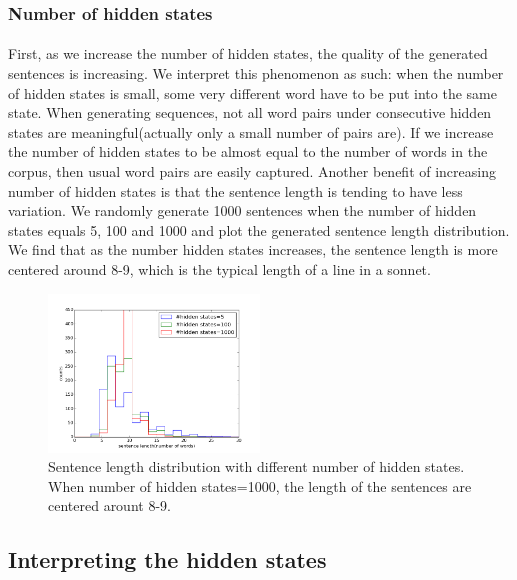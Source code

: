 %
\vspace{5pt}
\subsubsection{Number of hidden states}
\vspace{5pt}
\paragraph{}
 First, as we increase the number of hidden states, the quality of the generated sentences is increasing. We interpret this phenomenon as such: when the number of hidden states is small, some very different word have to be put into the same state. When generating sequences, not all word pairs under consecutive hidden states are meaningful(actually only a small number of pairs are). If we increase the number of hidden states to be almost equal to the number of words in the corpus, then usual word pairs are easily captured. Another benefit of increasing number of hidden states is that the sentence length is tending to have less variation. We randomly generate 1000 sentences when the number of hidden states equals 5, 100 and 1000 and plot the generated sentence length distribution. We find that as the number hidden states increases, the sentence length is more centered around 8-9, which is the typical length of a line in a sonnet.
 \begin{figure}[h!]
 \centering
 \includegraphics[width=0.5\textwidth]{../figure/hiddenstate_len_distri.png}
 \caption{Sentence length distribution with different number of hidden states. When number of hidden states=1000, the length of the sentences are centered arount 8-9.}
 \end{figure}
\vspace{5pt}
\subsection{Interpreting the hidden states}
\vspace{5pt}
